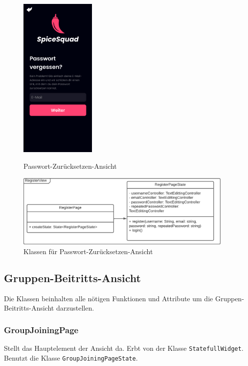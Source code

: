 \documentclass[parskip=full]{scrartcl}
\begin{document}
            \begin{figure}[htp]
                \begin{minipage}
                    [t]{0.49\textwidth}
                    \centering
                    \includegraphics[height=80mm]{images/Presentation-layer/PasswordResetView.jpg}
                    \caption{Passwort-Zurücksetzen-Ansicht}
                \end{minipage}
                \begin{minipage}
                    [t]{0.49\textwidth}
                    \centering
                    \includegraphics[width=0.95\textwidth]{images/Presentation-layer/PasswordResetViewClass.pdf}
                    \caption{Klassen für Passwort-Zurücksetzen-Ansicht}
                \end{minipage}
            \end{figure}    
        
            \newpage

\subsection{Gruppen-Beitritts-Ansicht}
    Die Klassen beinhalten alle nötigen Funktionen und Attribute um die Gruppen-Beitritts-Ansicht darzustellen.

    \subsubsection{GroupJoiningPage}
    Stellt das Hauptelement der Ansicht da. Erbt von der Klasse \texttt{StatefullWidget}. Benutzt die Klasse \texttt{GroupJoiningPageState}. 
\end{document}
